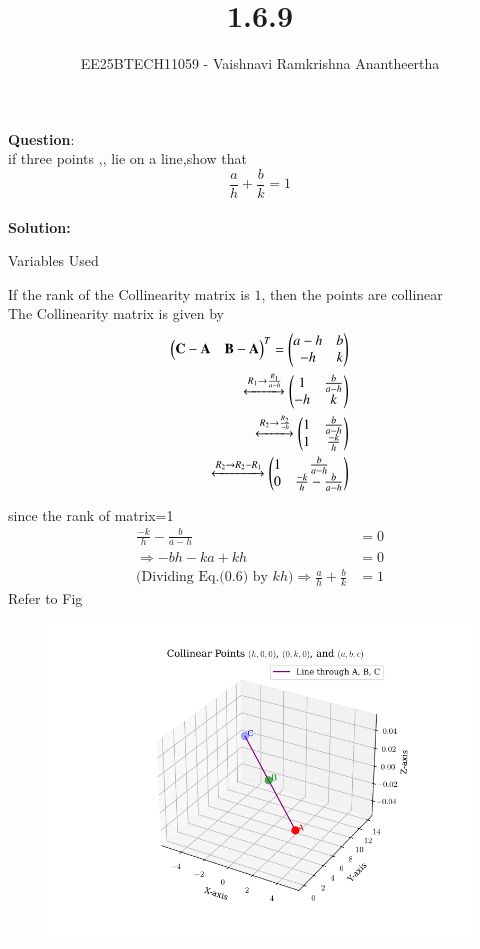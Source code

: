 \documentclass[journal]{IEEEtran}
\title{1.6.9}
\author{EE25BTECH11059 - Vaishnavi Ramkrishna Anantheertha}
\begin{document}
\maketitle

\renewcommand{\thefigure}{\theenumi}
\renewcommand{\thetable}{\theenumi}


\textbf{Question}:\\
if three points ,, lie on a line,show that
\[
\frac{a}{h} + \frac{b}{k} = 1
\]
\\
\textbf{Solution: }
\begin{table}[H]    
  \centering
  
  \caption{Variables Used}
  \label{tab:1.6.9}
\end{table}
If the rank of the Collinearity matrix is $1$, then the points are collinear\\
   The Collinearity matrix is given by\\
\begin{align}
    \begin{pmatrix}
    \mathbf{C}-\mathbf{A} & \mathbf{B}-\mathbf{A}
  \end{pmatrix}^T = \begin{pmatrix}
    a-h & b
    \\
    -h & k
    \end{pmatrix}\\
  \xleftrightarrow[]{R_1 \rightarrow {\frac{R_1}{a-h}}}
 \begin{pmatrix}
    1 & \frac{b}{a-h}
    \\
    -h & k
    \end{pmatrix}\\
     \xleftrightarrow[]{R_2 \rightarrow {\frac{R_2}{-h}}}
 \begin{pmatrix}
     1 & \frac{b}{a-h}
    \\
     1 & \frac{-k}{h}
    \end{pmatrix}\\
       \xleftrightarrow[]{R_2 \rightarrow R_2- R_1}
 \begin{pmatrix}
    1 & \frac{b}{a-h}
    \\
    0 & \frac{-k}{h}-\frac{b}{a-h}
      \end{pmatrix} 
\end{align}

since the rank of matrix=1
\begin{align}
    \frac{-k}{h} - \frac{b}{a - h} &= 0 \label{eq1} \\
    \Rightarrow -bh - ka + kh &= 0 \label{eq2} \\
    \text{(Dividing Eq.(0.6) by $kh$)} 
    \Rightarrow \frac{a}{h} + \frac{b}{k} &= 1 \label{eq3}
\end{align}
Refer to Fig

\begin{figure}[H]
\begin{center}
\includegraphics[width=0.6\columnwidth]{figs/graph1.png}
\end{center}
\caption{}
\label{fig:Fig}
\end{figure}
\end{document}
